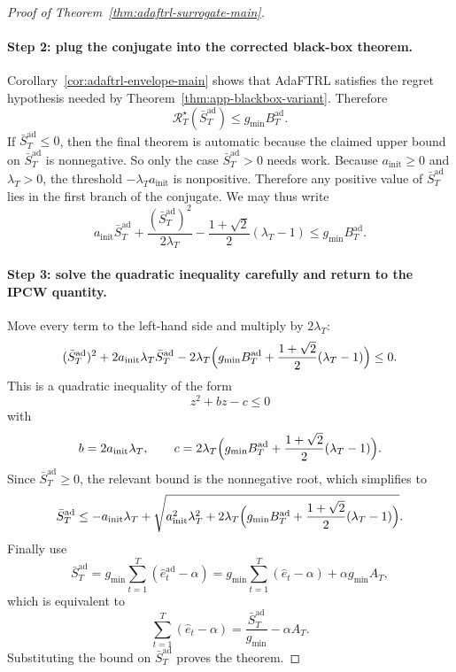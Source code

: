 \documentclass[11pt]{article}
\newcommand{\1}{\mathbf{1}}
\begin{document}
\begin{proof}[Proof of Theorem~\ref{thm:adaftrl-surrogate-main}]
\paragraph{Step 2: plug the conjugate into the corrected black-box theorem.}
Corollary~\ref{cor:adaftrl-envelope-main} shows that AdaFTRL satisfies the regret hypothesis needed by Theorem~\ref{thm:app-blackbox-variant}. Therefore
\[
\mathcal R_T^\star(\bar S_T^{\mathrm{ad}})\le g_{\min}B_T^{\mathrm{ad}}.
\]
If $\bar S_T^{\mathrm{ad}}\le 0$, then the final theorem is automatic because the claimed upper bound on $\bar S_T^{\mathrm{ad}}$ is nonnegative. So only the case $\bar S_T^{\mathrm{ad}}>0$ needs work.
Because $a_{\mathrm{init}}\ge 0$ and $\lambda_T>0$, the threshold $-\lambda_T a_{\mathrm{init}}$ is nonpositive. Therefore any positive value of $\bar S_T^{\mathrm{ad}}$ lies in the first branch of the conjugate. We may thus write
\[
a_{\mathrm{init}}\bar S_T^{\mathrm{ad}}+\frac{(\bar S_T^{\mathrm{ad}})^2}{2\lambda_T}-\frac{1+\sqrt{2}}{2}(\lambda_T-1)\le g_{\min}B_T^{\mathrm{ad}}.
\]

\paragraph{Step 3: solve the quadratic inequality carefully and return to the IPCW quantity.}
Move every term to the left-hand side and multiply by $2\lambda_T$:
\[
(\bar S_T^{\mathrm{ad}})^2+2a_{\mathrm{init}}\lambda_T\bar S_T^{\mathrm{ad}}
-
2\lambda_T\Bigl(g_{\min}B_T^{\mathrm{ad}}+\frac{1+\sqrt{2}}{2}(\lambda_T-1)\Bigr)\le 0.
\]
This is a quadratic inequality of the form
\[
z^2+bz-c\le 0
\]
with
\[
b=2a_{\mathrm{init}}\lambda_T,
\qquad
c=2\lambda_T\Bigl(g_{\min}B_T^{\mathrm{ad}}+\frac{1+\sqrt{2}}{2}(\lambda_T-1)\Bigr).
\]
Since \(\bar S_T^{\mathrm{ad}}\ge 0\), the relevant bound is the nonnegative root, which simplifies to
\[
\bar S_T^{\mathrm{ad}}
\le
-a_{\mathrm{init}}\lambda_T
+
\sqrt{
a_{\mathrm{init}}^2\lambda_T^2
+
2\lambda_T\Bigl(g_{\min}B_T^{\mathrm{ad}}+\frac{1+\sqrt{2}}{2}(\lambda_T-1)\Bigr)
}.
\]
Finally use
\[
\bar S_T^{\mathrm{ad}}=g_{\min}\sum_{t=1}^T(\hat e_t^{\mathrm{ad}}-\alpha)
=g_{\min}\sum_{t=1}^T(\hat e_t-\alpha)+\alpha g_{\min}A_T,
\]
which is equivalent to
\[
\sum_{t=1}^T(\hat e_t-\alpha)=\frac{\bar S_T^{\mathrm{ad}}}{g_{\min}}-\alpha A_T.
\]
Substituting the bound on \(\bar S_T^{\mathrm{ad}}\) proves the theorem.
\end{proof}
\end{document}
